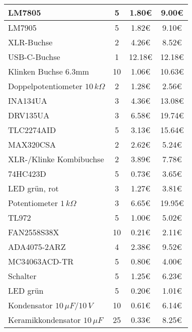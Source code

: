 \begin{longtable}{l|c|c|c}
      \hline
      {LM7805} & {5} & {1.80\euro{}} & {9.00\euro{}} \\
      \hline
      {LM7905} & {5} & {1.82\euro{}} & {9.10\euro{}} \\
      \hline
      {XLR-Buchse} & {2} & {4.26\euro{}} & {8.52\euro{}} \\
      \hline
      {USB-C-Buchse} & {1} & {12.18\euro{}} & {12.18\euro{}} \\
      \hline
      {Klinken Buchse 6.3mm} & {10} & {1.06\euro{}} & {10.63\euro{}} \\
      \hline
      {Doppelpotentiometer $10\,k\Omega$} & {2} & {1.28\euro{}} & {2.56\euro{}} \\
      \hline
      {INA134UA} & {3} & {4.36\euro{}} & {13.08\euro{}} \\
      \hline
      {DRV135UA} & {3} & {6.58\euro{}} & {19.74\euro{}} \\
      \hline
      {TLC2274AID} & {5} & {3.13\euro{}} & {15.64\euro{}} \\
      \hline
      {MAX320CSA} & {2} & {2.62\euro{}} & {5.24\euro{}} \\
      \hline
      {XLR-/Klinke Kombibuchse} & {2} & {3.89\euro{}} & {7.78\euro{}} \\
      \hline
      {74HC423D} & {5} & {0.73\euro{}} & {3.65\euro{}} \\
      \hline
      {LED grün, rot} & {3} & {1.27\euro{}} & {3.81\euro{}} \\
      \hline
      {Potentiometer $1\,k\Omega$} & {3} & {6.65\euro{}} & {19.95\euro{}} \\
      \hline
      {TL972} & {5} & {1.00\euro{}} & {5.02\euro{}} \\
      \hline
      {FAN2558S38X} & {10} & {0.21\euro{}} & {2.11\euro{}} \\
      \hline
      {ADA4075-2ARZ} & {4} & {2.38\euro{}} & {9.52\euro{}} \\
      \hline
      {MC34063ACD-TR} & {5} & {0.80\euro{}} & {4.00\euro{}} \\
      \hline
      {Schalter} & {5} & {1.25\euro{}} & {6.23\euro{}} \\
      \hline
      {LED grün} & {5} & {0.20\euro{}} & {1.01\euro{}} \\
      \hline
      {Kondensator $10\,\mu F$/$10\,V$} & {10} & {0.61\euro{}} & {6.14\euro{}} \\
      \hline
      {Keramikkondensator $10\,\mu F$} & {25} & {0.33\euro{}} & {8.25\euro{}} \\
      \hline

\end{longtable}
